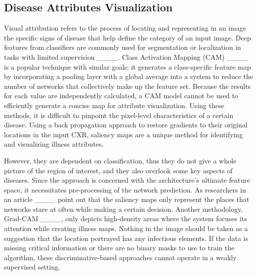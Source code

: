 \subsection{Disease Attributes Visualization}
{
Visual attribution refers to the process of locating and representing in an image the specific signs of disease that help define the category of an input image. Deep features from classifiers are commonly used for segmentation or localization in tasks with limited supervision ____. Class Activation Mapping (CAM) ____ is a popular technique with similar goals; it generates a class-specific feature map by incorporating a pooling layer with a global average into a system to reduce the number of networks that collectively make up the feature set. Because the results for each value are independently calculated, a CAM model cannot be used to efficiently generate a concise map for attribute visualization. Using these methods, it is difficult to pinpoint the pixel-level characteristics of a certain disease. Using a back propagation approach to restore gradients to their original locations in the input CXR, saliency maps are a unique method for identifying and visualizing illness attributes.

However, they are dependent on classification, thus they do not give a whole picture of the region of interest, and they also overlook some key aspects of diseases. Since the approach is concerned with the architecture's ultimate feature space, it necessitates pre-processing of the network prediction. As researchers in an article ____ point out that the saliency maps only represent the places that networks stare at often while making a certain decision. Another methodology, Grad-CAM ____, only depicts high-density areas where the system focuses its attention while creating illness maps. Nothing in the image should be taken as a suggestion that the location portrayed has any infectious elements. If the data is missing critical information or there are no binary masks to use to train the algorithm, these discriminative-based approaches cannot operate in a weakly supervised setting.

}
